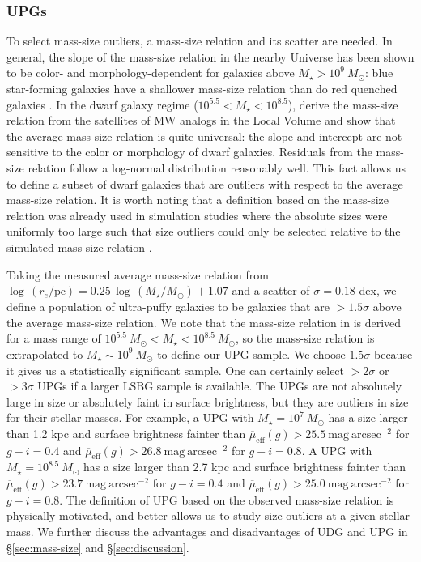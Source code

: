 \documentclass[twocolumn,astrosymb,twocolappendix]{aastex631}
\newcommand{\sbunit}{\mathrm{mag\ arcsec}^{-2}}
\newcommand{\sbeff}{\overline{\mu}_{\mathrm{eff}}(g)}
\begin{document}
\begin{CJK*}{UTF8}{gbsn}
\subsubsection{UPGs}
To select mass-size outliers, a mass-size relation and its scatter are needed. In general, the slope of the mass-size relation in the nearby Universe has been shown to be color- and morphology-dependent for galaxies above $M_\star > 10^{9}\ M_\odot$: blue star-forming galaxies have a shallower mass-size relation than do red quenched galaxies \citep[e.g.,][]{Lange2015}. In the dwarf galaxy regime ($10^{5.5} < M_\star < 10^{8.5}$), \citet{ELVES-I} derive the mass-size relation from the satellites of MW analogs in the Local Volume and show that the average mass-size relation is quite universal: the slope and intercept are not sensitive to the color or morphology of dwarf galaxies. Residuals from the mass-size relation follow a log-normal distribution reasonably well. This fact allows us to define a subset of dwarf galaxies that are outliers with respect to the average mass-size relation. It is worth noting that a definition based on the mass-size relation was already used in simulation studies where the absolute sizes were uniformly too large such that size outliers could only be selected relative to the simulated mass-size relation \citep[e.g.,][]{Benavides2021,Benavides2022}. 

Taking the measured average mass-size relation from \citet{ELVES-I} $\log\, (r_e/\mathrm{pc}) = 0.25\, \log\, (M_\star/M_\odot) + 1.07$ and a scatter of $\sigma=0.18$ dex, we define a population of ultra-puffy galaxies to be galaxies that are $>1.5\sigma$ above the average mass-size relation. We note that the mass-size relation in \citet{ELVES-I} is derived for a mass range of $10^{5.5}\ M_\odot < M_\star < 10^{8.5}\ M_\odot$, so the mass-size relation is extrapolated to $M_\star \sim 10^9\ M_\odot$ to define our UPG sample. We choose $1.5\sigma$ because it gives us a statistically significant sample. One can certainly select $>2\sigma$ or $>3\sigma$ UPGs if a larger LSBG sample is available. The UPGs are not absolutely large in size or absolutely faint in surface brightness, but they are outliers in size for their stellar masses. For example, a UPG with $M_\star = 10^7\ M_\odot$ has a size larger than 1.2 kpc and surface brightness fainter than $\sbeff > 25.5\ \sbunit$ for $g-i=0.4$ and $\sbeff > 26.8\ \sbunit$ for $g-i=0.8$. A UPG with $M_\star = 10^{8.5}\ M_\odot$ has a size larger than 2.7 kpc and surface brightness fainter than $\sbeff > 23.7\ \sbunit$ for $g-i=0.4$ and $\sbeff > 25.0\ \sbunit$ for $g-i=0.8$. The definition of UPG based on the observed mass-size relation is physically-motivated, and better allows us to study size outliers at a given stellar mass. We further discuss the advantages and disadvantages of UDG and UPG in \S\ref{sec:mass-size} and \S\ref{sec:discussion}.


\end{CJK*}
\end{document}
